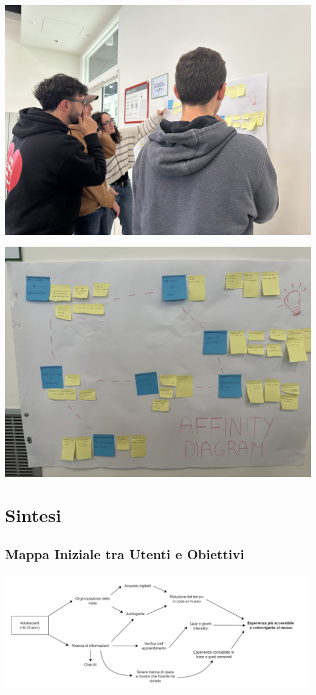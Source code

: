 \documentclass{article}
\begin{document}
\begin{center}
    \includegraphics[width=0.9\linewidth]{affinity_diagram.png}
\end{center}
\begin{center}
    \includegraphics[width=0.9\linewidth]{affinity_diagram2.jpg}
\end{center}

\section{Sintesi}

\subsection{Mappa Iniziale tra Utenti e Obiettivi}
\begin{center}
    \includegraphics[width=\textwidth]{map.png}
\end{center}
\end{document}

